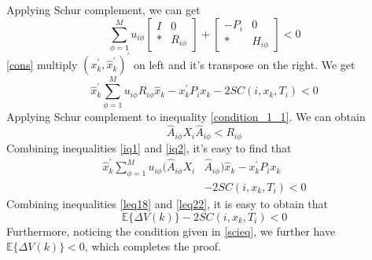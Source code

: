 \documentclass[conference]{IEEEtran}
\begin{document}
Applying Schur complement, we can get \\
\begin{equation} \label{cons}
\sum_{\phi=1}^{M}u_{i\phi} \begin{bmatrix}
I&0\\
*&R_{i\phi}
\end{bmatrix} + \begin{bmatrix}
-P_{i }&0\\
*&H_{i\phi}
\end{bmatrix} <0
\end{equation}
\eqref{cons} multiply $(x^{'}_k,\hat{x}^{'}_{k})^{'}$ on left and it's transpose on the right. We get\\
\begin{equation} \label{iq1}
\hat{x}^{'}_{k}\sum_{\phi=1}^{M}u_{i\phi}R_{i\phi}\hat{x}_k-x^{'}_{k}P_{i}x_{k}-2SC(i,x_k,T_i)<0
\end{equation}
Applying Schur complement to inequality \eqref{condition_1_1}. We can obtain \\
\begin{equation} \label{iq2}
\hat{A}_{i\phi}X_{i}\hat{A}_{i\phi}<R_{i\phi}
\end{equation}
Combining inequalities \eqref{iq1} and \eqref{iq2}, it's easy to find that \\
\begin{equation} \label{leq22}
	\begin{split}
	\hat{x}^{'}_{k}\sum_{\phi=1}^{M} u_{i\phi}(\hat{A}_{i\phi}X_{i}&\hat{A}_{i\phi}) \hat{x}_{k} - x^{'}_{k}P_{i}x_{k}\\
	&-2SC(i,x_k,T_i)<0
	\end{split}
\end{equation}
Combining inequalities \eqref{leq18} and \eqref{leq22}, it is easy to obtain that
\begin{equation}
		\mathbb{E}\{\varDelta V(k)\}-2SC(i,x_k,T_i)<0
\end{equation}
Furthermore, noticing the condition given in \eqref{scieq}, we further have $\mathbb{E}\{\varDelta V(k)\} < 0$, which completes the proof.
\\
\\
\end{document}
